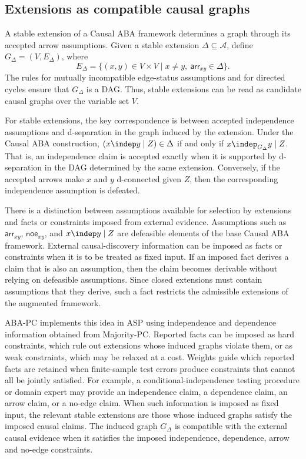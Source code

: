 \subsection{Extensions as compatible causal graphs}

A stable extension of a Causal ABA framework determines a graph through its accepted arrow assumptions. Given a stable extension \(\Delta \subseteq \mathcal{A}\), define \(G_{\Delta} = (V,E_{\Delta})\), where
\[
E_{\Delta} = \{(x,y) \in V \times V \mid x \neq y,\ \mathsf{arr}_{xy} \in \Delta\}.
\]
The rules for mutually incompatible edge-status assumptions and for directed cycles ensure that \(G_{\Delta}\) is a DAG. Thus, stable extensions can be read as candidate causal graphs over the variable set \(V\).

For stable extensions, the key correspondence is between accepted independence assumptions and d-separation in the graph induced by the extension. Under the Causal ABA construction, \((x \indep y \mid Z) \in \Delta\) if and only if \(x \indep_{G_{\Delta}} y \mid Z\). That is, an independence claim is accepted exactly when it is supported by d-separation in the DAG determined by the same extension. Conversely, if the accepted arrows make \(x\) and \(y\) d-connected given \(Z\), then the corresponding independence assumption is defeated.

There is a distinction between assumptions available for selection by extensions and facts or constraints imposed from external evidence. Assumptions such as \(\mathsf{arr}_{xy}\), \(\mathsf{noe}_{xy}\), and \(x \indep y \mid Z\) are defeasible elements of the base Causal ABA framework. External causal-discovery information can be imposed as facts or constraints when it is to be treated as fixed input. If an imposed fact derives a claim that is also an assumption, then the claim becomes derivable without relying on defeasible assumptions. Since closed extensions must contain assumptions that they derive, such a fact restricts the admissible extensions of the augmented framework.

ABA-PC implements this idea in ASP using independence and dependence information obtained from Majority-PC. Reported facts can be imposed as hard constraints, which rule out extensions whose induced graphs violate them, or as weak constraints, which may be relaxed at a cost. Weights guide which reported facts are retained when finite-sample test errors produce constraints that cannot all be jointly satisfied. For example, a conditional-independence testing procedure or domain expert may provide an independence claim, a dependence claim, an arrow claim, or a no-edge claim. When such information is imposed as fixed input, the relevant stable extensions are those whose induced graphs satisfy the imposed causal claims. The induced graph \(G_{\Delta}\) is compatible with the external causal evidence when it satisfies the imposed independence, dependence, arrow and no-edge constraints.

